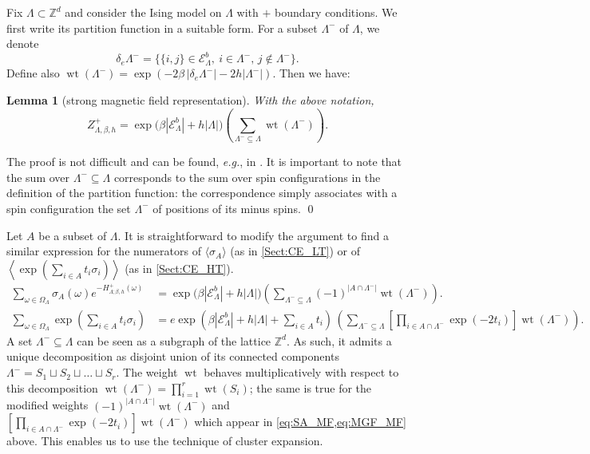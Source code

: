 \documentclass{amsart}
\newcommand{\field}[1]{\mathbb{#1}}
\newcommand{\Z}{\field{Z}}
\DeclareMathOperator\wt{wt}
\def\EEE{\mathcal{E}}
\numberwithin{equation}{section}
\newtheorem{lemma}[theorem]{Lemma}
\theoremstyle{remark}
\renewenvironment{proof}[1][Proof]{\begin{trivlist}
\item[\hskip \labelsep {\bfseries #1:}]}{\qed\end{trivlist}}
\begin{document}
Fix $\Lambda \subset \Z^d$ and consider the Ising model on $\Lambda$ with $+$ boundary conditions.
We first write its partition function in a suitable form.
For a subset $\Lambda^-$ of $\Lambda$, we denote 
\[\delta_e \Lambda^- = \{ \{i,j\} \in \EEE_\Lambda^b,\ i \in \Lambda^-,\, j \notin \Lambda^-\}.\]
Define also $\wt(\Lambda^-) = \exp(-2 \beta\, |\delta_e \Lambda^-| -2h|\Lambda^-|)$.
Then we have:
\begin{lemma}[strong magnetic field representation]
  With the above notation,
  \[Z^+_{\Lambda,\beta,h} = \exp \big( \beta|\EEE_\Lambda^b| +h |\Lambda| \big) 
  \left( \sum_{\Lambda^- \subseteq \Lambda} \wt(\Lambda^-) \right).\]
  \label{lem:Z_MF}
\end{lemma}
\begin{proof}
  The proof is not difficult and can be found, {\em e.g.}, in \cite[Section 5.7]{Velenik}.
  It is important to note that the sum over $\Lambda^- \subseteq \Lambda$ corresponds to
  the sum over spin configurations in the definition of the partition function:
  the correspondence simply associates with a spin configuration
  the set $\Lambda^-$ of positions of its minus spins.
\end{proof}
Let $A$ be a subset of $\Lambda$.
It is straightforward to modify the argument to find a similar expression for the numerators
of $\langle \sigma_A \rangle$ (as in \cref{Sect:CE_LT}) or of $\left\langle \exp\left(\sum_{i \in A} t_i \sigma_i \right) \right\rangle$ (as in \cref{Sect:CE_HT}).
\begin{align}
  \sum_{\omega \in \Omega_\Lambda} \sigma_A(\omega) e^{-H^+_{\Lambda;\beta,h}(\omega)} &= \exp \big( \beta|\EEE_\Lambda^b| +h |\Lambda| \big)              
  \left( \sum_{\Lambda^- \subseteq \Lambda} (-1)^{|A \cap \Lambda^-|} \wt(\Lambda^-) \right).\label{eq:SA_MF}\\
    \sum_{\omega \in \Omega_\Lambda} \exp\left(\sum_{i \in A} t_i \sigma_i \right) &= 
e   \exp \left( \beta|\EEE_\Lambda^b| +h |\Lambda| + \sum_{i \in A} t_i \right)
    \, \left( \sum_{\Lambda^- \subseteq \Lambda} \left[\prod_{i \in A \cap \Lambda^-} \exp(-2t_i)\right] \wt(\Lambda^-) \right).
    \label{eq:MGF_MF}
\end{align}
A set $\Lambda^- \subseteq \Lambda$ can be seen as a subgraph of the lattice $\Z^d$.
As such, it admits a unique decomposition as disjoint union of its connected components $\Lambda^-=S_1 \sqcup S_2 \sqcup \dots \sqcup S_r$.
The weight $\wt$ behaves multiplicatively with respect to this decomposition $\wt(\Lambda^-)=\prod_{i=1}^r \wt(S_i)$;
the same is true for the modified weights $(-1)^{|A \cap \Lambda^-|} \wt(\Lambda^-)$ and $\left[\prod_{i \in A \cap \Lambda^-} \exp(-2t_i)\right] \wt(\Lambda^-)$
which appear in \cref{eq:SA_MF,eq:MGF_MF} above.
This enables us to use the technique of cluster expansion.
\end{document}
